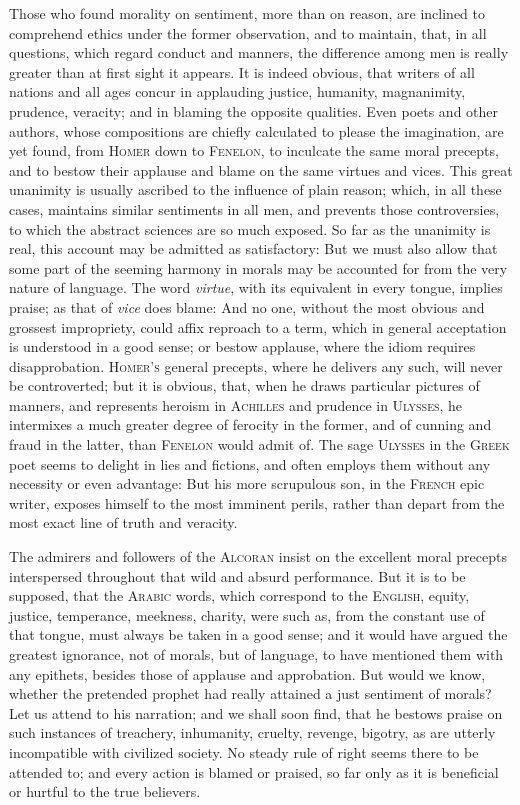 Those who found morality on sentiment, more than on reason, are
inclined to comprehend ethics under the former observation, and to
maintain, that, in all questions, which regard conduct and manners,
the difference among men is really greater than at first sight it
appears. It is indeed  obvious, that writers of all nations
and all ages concur in applauding justice, humanity, magnanimity,
prudence, veracity; and in blaming the opposite qualities. Even poets
and other authors, whose compositions are chiefly calculated to please
the imagination, are yet found, from \textsc{Homer} down to
\textsc{Fenelon}, to inculcate the same moral precepts, and to bestow
their applause and blame on the same virtues and vices. This great
unanimity is usually ascribed to the influence of plain reason; which,
in all these cases, maintains similar sentiments in all men, and
prevents those controversies, to which the abstract sciences are so
much exposed. So far as the unanimity is real, this account may be
admitted as satisfactory: But we must also allow that some part of the
seeming harmony in morals may be accounted for from the very nature of
language. The word \textit{virtue}, with its equivalent in every
tongue, implies praise; as that of \textit{vice} does blame: And no
one, without the most obvious and grossest impropriety, could affix
reproach to a term, which in general acceptation is understood in a
good sense; or bestow applause, where the idiom requires
disapprobation. \textsc{Homer's} general precepts, where he delivers
any such, will never be controverted; but it is obvious, that, when he
draws particular pictures of manners, and represents heroism in
\textsc{Achilles} and prudence in \textsc{Ulysses}, he intermixes a
much greater degree of ferocity in the former, and of cunning and
fraud in the latter, than \textsc{Fenelon} would admit of. The sage
\textsc{Ulysses} in the \textsc{Greek} poet seems to delight in lies
and fictions, and often employs them without any necessity or even
advantage: But his more scrupulous son, in the \textsc{French} epic
writer, exposes himself to the most imminent perils, rather than
depart from the most exact line of truth and veracity.

The admirers and followers of the \textsc{Alcoran} insist on the
excellent moral precepts interspersed throughout that wild and absurd
performance. But it is to be supposed, that the \textsc{Arabic} words,
which correspond to the \textsc{English}, equity, justice, temperance,
meekness, charity, were such as, from the constant use of that tongue,
must always be taken in a good sense; and it would have argued the
greatest ignorance, not of morals, but of language, to have mentioned
them with any epithets, besides those of applause and approbation. But
would we know, whether the pretended prophet had really attained a
just sentiment of morals? Let us attend to his  narration;
and we shall soon find, that he bestows praise on such instances of
treachery, inhumanity, cruelty, revenge, bigotry, as are utterly
incompatible with civilized society. No steady rule of right seems
there to be attended to; and every action is blamed or praised, so far
only as it is beneficial or hurtful to the true believers.

